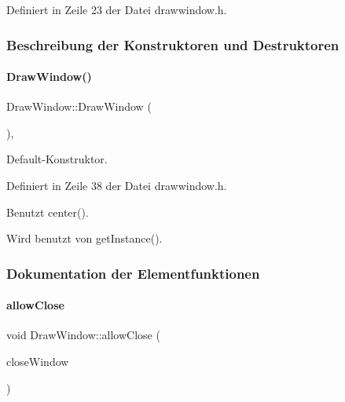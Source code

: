 Definiert in Zeile 23 der Datei drawwindow.\+h.



\subsubsection{Beschreibung der Konstruktoren und Destruktoren}
\mbox{\label{classDrawWindow_a6306ab8ed8304e89d1eb27a356e327a2}} 
\paragraph{\texorpdfstring{Draw\+Window()}{DrawWindow()}}
{\footnotesize\ttfamily Draw\+Window\+::\+Draw\+Window (\begin{DoxyParamCaption}{ }\end{DoxyParamCaption})\hspace{0.3cm}{\ttfamily [inline]}, {\ttfamily [private]}}



Default-\/\+Konstruktor. 



Definiert in Zeile 38 der Datei drawwindow.\+h.



Benutzt center().



Wird benutzt von get\+Instance().



\subsubsection{Dokumentation der Elementfunktionen}
\mbox{\label{classDrawWindow_ab7934ccfbfba2c54c9837fdd5aaec4ea}} 
\paragraph{\texorpdfstring{allow\+Close}{allowClose}}
{\footnotesize\ttfamily void Draw\+Window\+::allow\+Close (\begin{DoxyParamCaption}\item[{Q\+Wait\+Condition $\ast$}]{close\+Window }\end{DoxyParamCaption})\hspace{0.3cm}{\ttfamily [slot]}}



